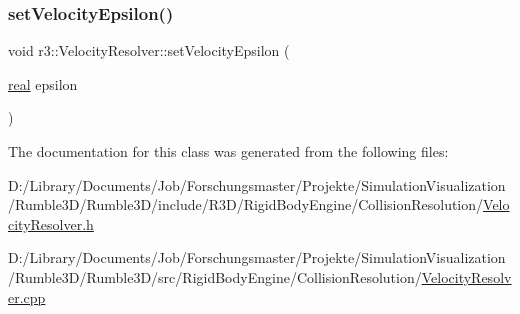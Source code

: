 \mbox{\label{classr3_1_1_velocity_resolver_a91b4f4f3c064f11983ae9dbe40232c86}} 
\subsubsection{\texorpdfstring{set\+Velocity\+Epsilon()}{setVelocityEpsilon()}}
{\footnotesize\ttfamily void r3\+::\+Velocity\+Resolver\+::set\+Velocity\+Epsilon (\begin{DoxyParamCaption}\item[{\mbox{\hyperlink{namespacer3_ab2016b3e3f743fb735afce242f0dc1eb}{real}}}]{epsilon }\end{DoxyParamCaption})}



The documentation for this class was generated from the following files\+:\begin{DoxyCompactItemize}
\item 
D\+:/\+Library/\+Documents/\+Job/\+Forschungsmaster/\+Projekte/\+Simulation\+Visualization/\+Rumble3\+D/\+Rumble3\+D/include/\+R3\+D/\+Rigid\+Body\+Engine/\+Collision\+Resolution/\mbox{\hyperlink{_velocity_resolver_8h}{Velocity\+Resolver.\+h}}\item 
D\+:/\+Library/\+Documents/\+Job/\+Forschungsmaster/\+Projekte/\+Simulation\+Visualization/\+Rumble3\+D/\+Rumble3\+D/src/\+Rigid\+Body\+Engine/\+Collision\+Resolution/\mbox{\hyperlink{_velocity_resolver_8cpp}{Velocity\+Resolver.\+cpp}}\end{DoxyCompactItemize}

